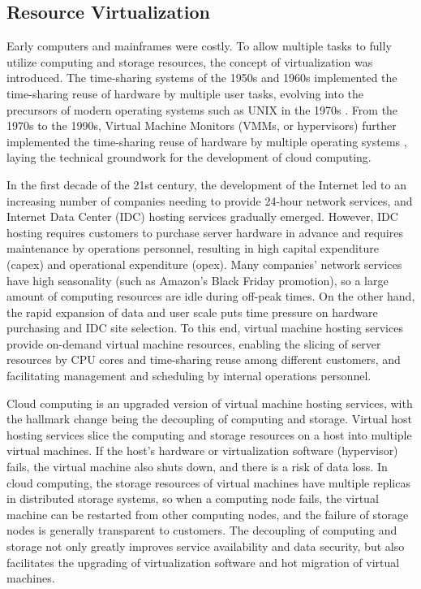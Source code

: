 \subsection{Resource Virtualization}
\label{background:sec:datacenter-virtualization}

Early computers and mainframes were costly. To allow multiple tasks to fully utilize computing and storage resources, the concept of virtualization was introduced. The time-sharing systems of the 1950s and 1960s \cite{strachey1959time,amdahl1964architecture} implemented the time-sharing reuse of hardware by multiple user tasks, evolving into the precursors of modern operating systems such as UNIX in the 1970s \cite{bach1986design}. From the 1970s to the 1990s, Virtual Machine Monitors (VMMs, or hypervisors) further implemented the time-sharing reuse of hardware by multiple operating systems \cite{popek1974formal,agesen2010evolution}, laying the technical groundwork for the development of cloud computing.

In the first decade of the 21st century, the development of the Internet led to an increasing number of companies needing to provide 24-hour network services, and Internet Data Center (IDC) hosting services gradually emerged. However, IDC hosting requires customers to purchase server hardware in advance and requires maintenance by operations personnel, resulting in high capital expenditure (capex) and operational expenditure (opex). Many companies' network services have high seasonality (such as Amazon's Black Friday promotion), so a large amount of computing resources are idle during off-peak times. On the other hand, the rapid expansion of data and user scale puts time pressure on hardware purchasing and IDC site selection. To this end, virtual machine hosting services provide on-demand virtual machine resources, enabling the slicing of server resources by CPU cores and time-sharing reuse among different customers, and facilitating management and scheduling by internal operations personnel.

Cloud computing is an upgraded version of virtual machine hosting services, with the hallmark change being the decoupling of computing and storage. Virtual host hosting services slice the computing and storage resources on a host into multiple virtual machines. If the host's hardware or virtualization software (hypervisor) fails, the virtual machine also shuts down, and there is a risk of data loss. In cloud computing, the storage resources of virtual machines have multiple replicas in distributed storage systems, so when a computing node fails, the virtual machine can be restarted from other computing nodes, and the failure of storage nodes is generally transparent to customers. The decoupling of computing and storage not only greatly improves service availability and data security, but also facilitates the upgrading of virtualization software and hot migration of virtual machines.

